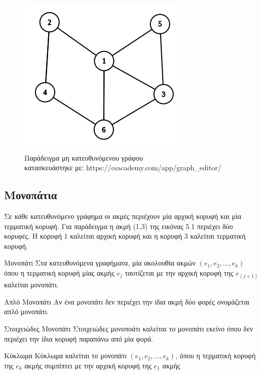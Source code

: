 \documentclass[oneside,12pt]{book}
\newenvironment{matlab}
	{\begin{figure}[hp]\centering\captionsetup{justification=centering}}
	{\end{figure}}
\theoremstyle{definition}
\begin{document}
\begin{matlab}
	\includegraphics[scale=0.8]{images/undirected_graph_example.png}
	\caption{Παράδειγμα μη κατευθυνόμενου γράφου \\ κατασκευάστηκε με: https://csacademy.com/app/graph\_editor/}
\end{matlab}

\subsection{Μονοπάτια}

Σε κάθε κατευθυνόμενο γράφημα οι ακμές περιέχουν μία αρχική κορυφή και μία τερματική κορυφή. Για παράδειγμα η ακμή (1,3) της εικόνας 5.1 περιέχει δύο κορυφές. Η κορυφή 1 καλείται αρχική κορυφή και η κορυφή 3 καλείται τερματική κορυφή. \\

\begin{mydefinition}{Μονοπάτι}{}
	Στα κατευθυνόμενα γραφήματα, μία ακολουθία ακμών \((e_1, e_2,...,e_k)\) όπου η τερματική κορυφή μίας ακμής \(e_j\) ταυτίζεται με την αρχική κορυφή της \(e_{(j+1)}\) καλείται μονοπάτι.
\end{mydefinition}

\begin{mydefinition}{Απλό Μονοπάτι}{}
	Αν ένα μονοπάτι δεν περιέχει την ίδια ακμή δύο φορές ονομάζεται απλό μονοπάτι.
\end{mydefinition}

\begin{mydefinition}{Στοιχειώδες Μονοπάτι}{}
	Στοιχειώδες μονοποάτι καλείται το μονοπάτι εκείνο όπου δεν περιέχει την ίδια κορυφή παραπάνω από μία φορά.
\end{mydefinition}

\begin{mydefinition}{Κύκλωμα}{}
	Κύκλωμα καλείται το μονοπάτι \((e_1, e_2,...,e_k)\), όπου η τερματική κορυφή της \(e_k\) ακμής συμπίπτει με την αρχική κορυφή της \(e_1\) ακμής
\end{mydefinition}
\end{document}
